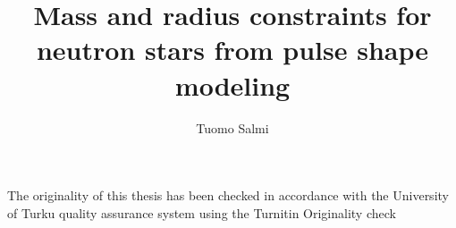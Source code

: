 \documentclass{wihuri}
\begin{document}


\title{Mass and radius constraints for neutron stars
from pulse shape modeling}
\author{Tuomo Salmi}

\maketitle
\newpage
\thispagestyle{empty}
\vspace*{10cm}

\vfill

  
\hspace*{-2cm}\parbox{\textwidth}{The originality of this thesis has been checked in accordance with the University of Turku quality assurance system using the Turnitin Originality check}
  


\newpage

\end{document}

